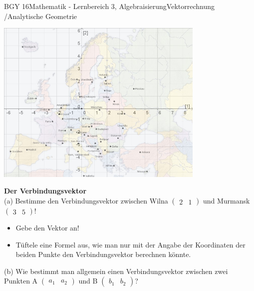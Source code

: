 \documentclass[oneside,openany,headings=optiontotoc,11pt,numbers=noenddot]{scrreprt}
\begin{document}
	\begin{worksheet}{BGY 16}{Mathematik - Lernbereich 3, Algebraisierung}{Vektorrechnung /Analytische Geometrie}
				
		\noindent
		\sffamily
		\begin{center}
		\includegraphics[width=0.75\textwidth]{Bilder/MapKoord.jpg}
		\end{center}
		\begin{framed}
			\noindent
			\textbf{Der Verbindungsvektor}\\
			(a) Bestimme den Verbindungsvektor zwischen Wilna \(\begin{pmatrix}
			2 & 1
			\end{pmatrix}\) und Murmansk \(\begin{pmatrix}
			3 & 5
			\end{pmatrix}\)!
			\
			\begin{framed}
					\begin{itemize}
						\item Gebe den Vektor an!
						\item Tüftele eine Formel aus, wie man nur mit der Angabe der Koordinaten der beiden Punkte den Verbindungsvektor berechnen könnte.
					\end{itemize}
			\end{framed}
			\noindent
			(b) Wie bestimmt man allgemein einen Verbindungsvektor zwischen zwei Punkten A \(\begin{pmatrix}a_{1} & a_{2}\end{pmatrix}\) und B \(\begin{pmatrix}b_{1} & b_{2}\end{pmatrix}\)?\\

\end{framed}
\end{worksheet}
\end{document}
